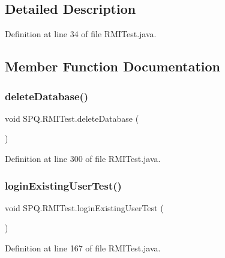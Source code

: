 \subsection{Detailed Description}


Definition at line 34 of file R\+M\+I\+Test.\+java.



\subsection{Member Function Documentation}
\mbox{\label{class_s_p_q_1_1_r_m_i_test_a38f0b0aa6d0cf1cf8f5bf3960b75954e}} 
\subsubsection{\texorpdfstring{delete\+Database()}{deleteDatabase()}}
{\footnotesize\ttfamily void S\+P\+Q.\+R\+M\+I\+Test.\+delete\+Database (\begin{DoxyParamCaption}{ }\end{DoxyParamCaption})}



Definition at line 300 of file R\+M\+I\+Test.\+java.

\mbox{\label{class_s_p_q_1_1_r_m_i_test_a0e9430910652b8ebeb99d2e871476ff1}} 
\subsubsection{\texorpdfstring{login\+Existing\+User\+Test()}{loginExistingUserTest()}}
{\footnotesize\ttfamily void S\+P\+Q.\+R\+M\+I\+Test.\+login\+Existing\+User\+Test (\begin{DoxyParamCaption}{ }\end{DoxyParamCaption})}



Definition at line 167 of file R\+M\+I\+Test.\+java.

